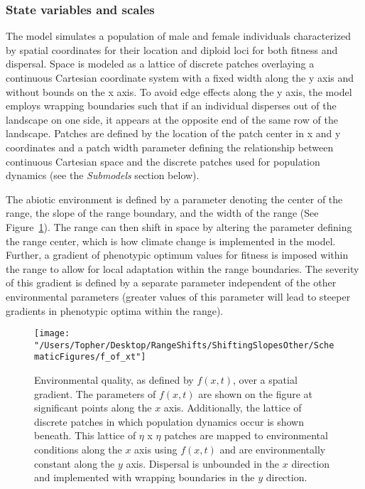 \documentclass[11pt, oneside]{article}
\begin{document}
\subsubsection{State variables and scales}
The model simulates a population of male and female individuals characterized by spatial coordinates for their location and diploid loci for both fitness and dispersal. Space is modeled as a lattice of discrete patches overlaying a continuous Cartesian coordinate system with a fixed width along the y axis and without bounds on the x axis. To avoid edge effects along the y axis, the model employs wrapping boundaries such that if an individual disperses out of the landscape on one side, it appears at the opposite end of the same row of the landscape. Patches are defined by the location of the patch center in x and y coordinates and a patch width parameter defining the relationship between continuous Cartesian space and the discrete patches used for population dynamics (see the \textit{Submodels} section below). 

The abiotic environment is defined by a parameter denoting the center of the range, the slope of the range boundary, and the width of the range (See Figure~\ref{fig:EnvFunction}). The range can then shift in space by altering the parameter defining the range center, which is how climate change is implemented in the model. Further, a gradient of phenotypic optimum values for fitness is imposed within the range to allow for local adaptation within the range boundaries. The severity of this gradient is defined by a separate parameter independent of the other environmental parameters (greater values of this parameter will lead to steeper gradients in phenotypic optima within the range).

\begin{figure}
\centering
\texttt{[image: "/Users/Topher/Desktop/RangeShifts/ShiftingSlopesOther/SchematicFigures/f\_of\_xt"]}
\vspace{-5mm}
\caption[LoF entry]{Environmental quality, as defined by $f(x,t)$, over a spatial gradient. The parameters of $f(x,t)$ are shown on the figure at significant points along the $x$ axis. Additionally, the lattice of discrete patches in which population dynamics occur is shown beneath. This lattice of $\eta$ x $\eta$ patches are mapped to environmental conditions along the $x$ axis using $f(x,t)$ and are environmentally constant along the $y$ axis. Dispersal is unbounded in the $x$ direction and implemented with wrapping boundaries in the $y$ direction.}
\label{fig:EnvFunction}
\end{figure}
\end{document}
